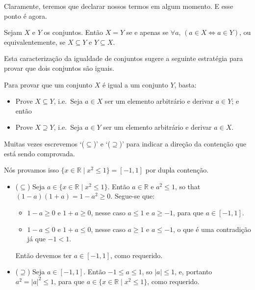 Claramente, teremos que declarar nossos termos em algum momento. E esse ponto é agora.

\begin{axiom}
\label{axSetEquality}
Sejam $X$ e $Y$ os conjuntos. Então $X=Y$ se e apenas se $\forall a,\, (a \in X \Leftrightarrow a \in Y)$, ou equivalentemente, se $X \subseteq Y$ e $Y \subseteq X$.
\end{axiom}

Esta caracterização da igualdade de conjuntos sugere a seguinte estratégia para provar que dois
conjuntos são iguais.

\begin{strategy}
Para provar que um conjunto $X$ é igual a um conjunto $Y$, basta:
\begin{itemize}
\item Prove $X \subseteq Y$, i.e.\ Seja $a \in X$ ser um elemento arbitrário e derivar $a \in Y$; e então
\item Prove $X \supseteq Y$, i.e.\ Seja $a \in Y$ ser um elemento arbitrário e derivar $a \in X$.
\end{itemize}
Muitas vezes escrevemos `($\subseteq$)' e `($\supseteq$)' para indicar a direção da contenção que está sendo comprovada.
\end{strategy}

\begin{example}
\label{exPositiveNegativeSetBuilderNotation}
Nós provamos isso $\{ x \in \mathbb{R} \mid x^2 \le 1 \} = [-1,1]$ por dupla contenção.
\begin{itemize}
\item ($\subseteq$) Seja $a \in \{ x \in \mathbb{R} \mid x^2 \le 1 \}$. Então $a \in \mathbb{R}$ e $a^2 \le 1$, so that $(1-a)(1+a) = 1-a^2 \ge 0$. Segue-se que:
\begin{itemize}
\item $1-a \ge 0$ e $1+a \ge 0$, nesse caso $a \le 1$ e $a \ge -1$, para que $a \in [-1,1]$.
\item $1-a \le 0$ e $1+a \le 0$, nesse caso $a \ge 1$ e $a \le -1$, o que é uma contradição já que $-1 < 1$.
\end{itemize}
Então devemos ter $a \in [-1,1]$, como requerido.

\item ($\supseteq$) Seja $a \in [-1,1]$. Então $-1 \le a \le 1$, so $|a| \le 1$, e, portanto $a^2 = |a|^2 \le 1$, para que $a \in \{ x \in \mathbb{R} \mid x^2 \le 1 \}$, 
como requerido.
\end{itemize}
\end{example}

